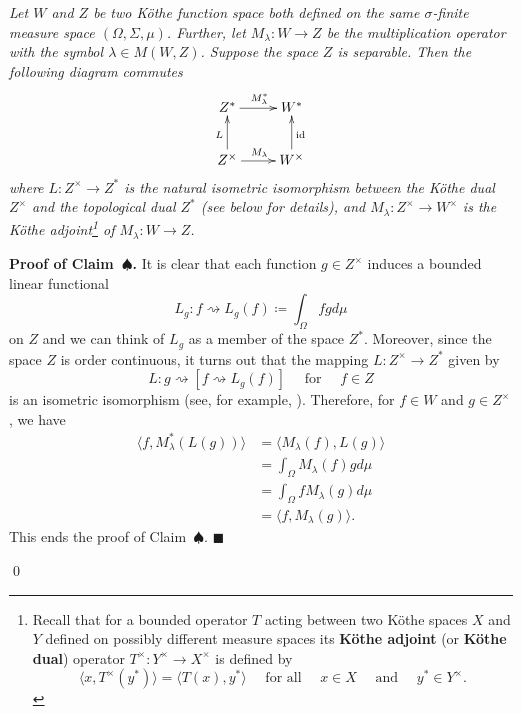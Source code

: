 \documentclass[11pt]{amsart}
\theoremstyle{definition}
\theoremstyle{definition}
\theoremstyle{definition}
\theoremstyle{definition}
\theoremstyle{definition}
\theoremstyle{definition}
\theoremstyle{definition}
\theoremstyle{definition}
\numberwithin{equation}{section}
\numberwithin{equation}{section}
\numberwithin{equation}{section}
\theoremstyle{definition}
\theoremstyle{definition}
\theoremstyle{definition}
\theoremstyle{definition}
\theoremstyle{definition}
\theoremstyle{definition}
\renewenvironment{proof}{\noindent {\bf Proof.}}{\qed}
\begin{document}
\begin{proof}
	\vspace{5pt} 
	{\it Let $W$ and $Z$ be two K{\" o}the function space both defined on the same $\sigma$-finite measure space $(\Omega,\Sigma,\mu)$.
		Further, let $M_{\lambda} \colon W \rightarrow Z$ be the multiplication operator with the symbol $\lambda \in M(W,Z)$.
		Suppose the space $Z$ is separable. Then the following diagram commutes}
		\begin{equation*}
			\xymatrix{
				Z^* \ar[r]^{M_{\lambda}^*} & W^*\\
				Z^{\times} \ar[u]^{L} \ar[r]^{M_{\lambda}} & W^{\times} \ar[u]_{\text{id}}}
		\end{equation*}
	{\it where $L \colon Z^{\times} \rightarrow Z^*$ is the natural isometric isomorphism between the K{\" o}the dual $Z^{\times}$
		and the topological dual $Z^*$ (see below for details), and $M_{\lambda} \colon Z^{\times} \rightarrow W^{\times}$ is the K{\" o}the
		adjoint\footnote{Recall that for a bounded operator $T$ acting between two K{\" o}the spaces $X$ and $Y$ defined on possibly
		different measure spaces its {\bf K{\" o}the adjoint} (or {\bf K{\" o}the dual}) operator $T^{\times} \colon Y^{\times} \rightarrow X^{\times}$
		is defined by
		\begin{equation*}
			\langle x,T^{\times}(y^{*}) \rangle = \langle T(x),y^{*} \rangle \quad \text{ for all } \quad x \in X \quad \text{ and } \quad y^* \in Y^{\times}.
		\end{equation*}
		} of $M_{\lambda} \colon W \rightarrow Z$.}
	
	\vspace{5pt} \noindent
	{\bf Proof of Claim~$\spadesuit$.}
	It is clear that each function $g \in Z^{\times}$ induces a bounded linear functional
	\begin{equation*}
		L_g \colon f \rightsquigarrow L_g(f) \coloneqq \int_{\Omega} f g d\mu
	\end{equation*}
	on $Z$ and we can think of $L_g$ as a member of the space $Z^*$. Moreover, since the space $Z$ is order continuous, it turns out that the mapping
	$L \colon Z^{\times} \rightarrow Z^*$ given by
	\begin{equation*}
		L \colon g \rightsquigarrow \left[ f \rightsquigarrow L_g(f) \right] \quad \text{ for } \quad f \in Z
	\end{equation*}
	is an isometric isomorphism (see, for example, \cite[Theorem~4.1, p.~20]{BS88}).
	Therefore, for $f \in W$ and $g \in Z^{\times}$, we have
	\begin{align*}
		\langle f, M_{\lambda}^{*}(L(g)) \rangle
			& = \langle M_{\lambda}(f), L(g) \rangle \\
			& = \int_{\Omega} M_{\lambda}(f) g d\mu \\
			& = \int_{\Omega} f M_{\lambda}(g) d\mu \\
			& = \langle f, M_{\lambda}(g) \rangle.
	\end{align*}
	This ends the proof of Claim~$\spadesuit$.
	\hfill $\blacksquare$
	

\end{proof}
\end{document}
